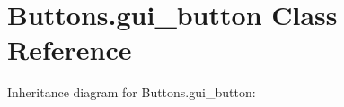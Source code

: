 \hypertarget{class_buttons_1_1gui__button}{}\section{Buttons.\+gui\+\_\+button Class Reference}
\label{class_buttons_1_1gui__button}


Inheritance diagram for Buttons.\+gui\+\_\+button\+:
